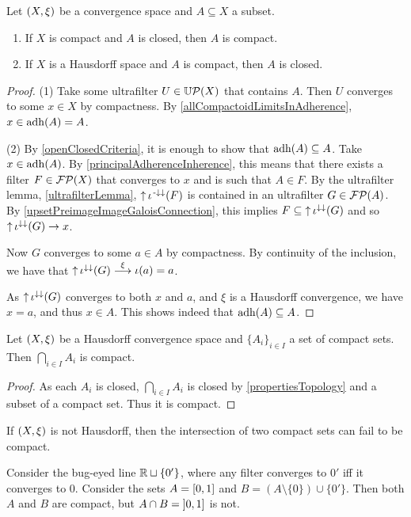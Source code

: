 \begin{proposition} \label{compactClosedSets}
Let $\sSet{X,\xi}$ be a convergence space and $A\subseteq X$ a subset.
\begin{enumerate}
\item If $X$ is compact and $A$ is closed, then $A$ is compact.
\item If $X$ is a Hausdorff space and $A$ is compact, then $A$ is closed.
\end{enumerate}
\end{proposition}
\begin{proof}
(1) Take some ultrafilter $U\in \operatorname{\mathbb{U}\mathcal{P}}(X)$ that contains $A$. Then $U$ converges to some $x\in X$ by compactness.
By \ref{allCompactoidLimitsInAdherence}, $x\in \operatorname{adh}(A) = A$.

(2) By \ref{openClosedCriteria}, it is enough to show that $\operatorname{adh}(A)\subseteq A$. Take $x\in \operatorname{adh}(A)$. By \ref{principalAdherenceInherence}, this means that there exists a filter $F\in \operatorname{\mathcal{FP}}(X)$ that converges to $x$ and is such that $A\in F$. By the ultrafilter lemma, \ref{ultrafilterLemma}, $\operatorname{\uparrow} \iota^{{\text{\hspace{0.15em}-}\downarrow}\downarrow}(F)$ is contained in an ultrafilter $G\in \operatorname{\mathcal{FP}}(A)$. By
\ref{upsetPreimageImageGaloisConnection}, this implies $F\subseteq \operatorname{\uparrow}\iota^{\downarrow\downarrow}(G)$ and so $\operatorname{\uparrow}\iota^{\downarrow\downarrow}(G) \to x$.

Now $G$ converges to some $a\in A$ by compactness. By continuity of the inclusion, we have that $\operatorname{\uparrow}\iota^{\downarrow\downarrow}(G) \overset{\xi}{\longrightarrow} \iota(a) = a$.

As $\operatorname{\uparrow}\iota^{\downarrow\downarrow}(G)$ converges to both $x$ and $a$, and $\xi$ is a Hausdorff convergence, we have $x = a$, and thus $x\in A$. This shows indeed that $\operatorname{adh}(A)\subseteq A$.
\end{proof}
\begin{corollary} \label{HausdorffCompactIntersection}
Let $\sSet{X,\xi}$ be a Hausdorff convergence space and $\{A_i\}_{i\in I}$ a set of compact sets. Then $\bigcap_{i\in I}A_i$ is compact.
\end{corollary}
\begin{proof}
As each $A_i$ is closed, $\bigcap_{i\in I}A_i$ is closed by \ref{propertiesTopology} and a subset of a compact set. Thus it is compact.
\end{proof}

\begin{example}
If $\sSet{X,\xi}$ is not Hausdorff, then the intersection of two compact sets can fail to be compact.

Consider the bug-eyed line $\mathbb{R}\sqcup\{0'\}$, where any filter converges to $0'$ iff it converges to $0$. Consider the sets $A = \interval{0,1}$ and $B= (A\setminus\{0\})\cup \{0'\}$. Then both $A$ and $B$ are compact, but $A\cap B = \interval[oc]{0,1}$ is not.
\end{example}


